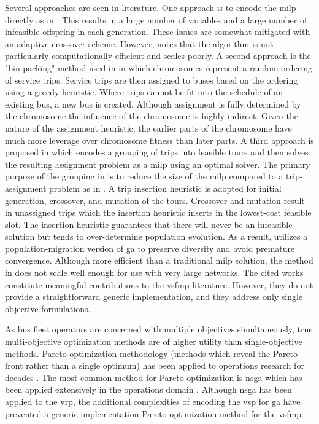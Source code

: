 Several approaches are seen in literature. One approach is to encode the \gls{milp} directly as in \cite{Li_2020_JAT}. This results in a large number of variables and a large number of infeasible offspring in each generation. These issues are somewhat mitigated with an adaptive crossover scheme. However, \cite{Li_2020_JAT} notes that the algorithm is not particularly computationally efficient and scales poorly. A second approach is the "bin-packing" method used in \cite{Yao_2020_SCS} in which chromosomes represent a random ordering of service trips. Service trips are then assigned to buses based on the ordering using a greedy heuristic. Where trips cannot be fit into the schedule of an existing bus, a new bus is created. Although assignment is fully determined by the chromosome the influence of the chromosome is highly indirect. Given the nature of the assignment heuristic, the earlier parts of the chromosome have much more leverage over chromosome fitness than later parts. A third approach is proposed in \cite{Rogge_2018_AE} which encodes a grouping of trips into feasible tours and then solves the resulting assignment problem as a \gls{milp} using an optimal solver. The primary purpose of the grouping in \cite{Rogge_2018_AE} is to reduce the size of the \gls{milp} compared to a trip-assignment problem as in \cite{Wang_2022_TRD}. A trip insertion heuristic is adopted for initial generation, crossover, and mutation of the tours. Crossover and mutation result in unassigned trips which the insertion heuristic inserts in the lowest-cost feasible slot. The insertion heuristic guarantees that there will never be an infeasible solution but tends to over-determine population evolution. As a result, \cite{Rogge_2018_AE} utilizes a population-migration version of \gls{ga} to preserve diversity and avoid premature convergence. Although more efficient than a traditional \gls{milp} solution, the method in \cite{Rogge_2018_AE} does not scale well enough for use with very large networks. The cited works constitute meaningful contributions to the \gls{vsfmp} literature. However, they do not provide a straightforward generic implementation, and they address only single objective formulations.

As bus fleet operators are concerned with multiple objectives simultaneously, true multi-objective optimization methods are of higher utility than single-objective methods. Pareto optimization methodology (methods which reveal the Pareto front rather than a single optimum) has been applied to operations research for decades \cite{Baita_2000_CER}. The most common method for Pareto optimization is \gls{nsga} \cite{Deb_2002_TEC} which has been applied extensively in the operations domain \cite{Verma_2021_IA}. Although \gls{nsga} has been applied to the \gls{vrp}, the additional complexities of encoding the \gls{vsp} for \gls{ga} have prevented a generic implementation Pareto optimization method for the \gls{vsfmp}.

